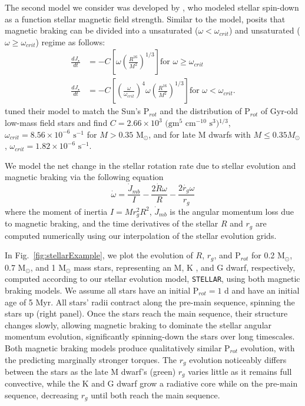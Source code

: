 \documentclass[twocolumn]{aastex61}
\newcommand{\stellar}[0]{\texttt{STELLAR}\xspace}
\begin{document}
The second model we consider was developed by \citet{Reiners2012}, who modeled stellar spin-down as a function stellar magnetic field strength.  Similar to the \citet{Matt2015} model, \citet{Reiners2012} posits that magnetic braking can be divided into a unsaturated ($\omega < \omega_{crit}$) and unsaturated ($\omega \geq \omega_{crit}$) regime as follows:
\begin{equation} \label{eqn:reiners}
\begin{split}
\frac{dJ_{\star}}{dt} & = -C \left[ \omega \left(\frac{R^{16}}{M^2} \right)^{1/3} \right] \text{for $\omega \geq \omega_{crit}$} \\
\frac{dJ_{\star}}{dt} & = -C \left[ \left( \frac{\omega}{\omega_{crit}} \right)^4 \omega \left(\frac{R^{16}}{M^2} \right)^{1/3} \right] \text{for $\omega < \omega_{crit}$}.
\end{split}
\end{equation}
\citet{Reiners2012} tuned their model to match the Sun's P$_{rot}$ and the distribution of P$_{rot}$ of Gyr-old low-mass field stars and find $C = 2.66 \times 10^3 \text{ (gm$^5$ cm$^{-10}$ s$^3$)$^{1/3}$}$, $\omega_{crit} = 8.56 \times 10^{-6}\text{ s$^{-1}$}$ for $M > 0.35$ M$_{\odot}$, and for late M dwarfs with $M \leq 0.35 M_{\odot}$, $\omega_{crit} = 1.82 \times 10^{-6} \text{ s$^{-1}$}$.

We model the net change in the stellar rotation rate due to stellar evolution and magnetic braking via the following equation 
\begin{equation} \label{eqn:stellar_rot_rate_dt}
\dot{\omega} = \frac{\dot{J}_{mb}}{I} - \frac{2 \dot{R} \omega}{R} - \frac{2 \dot{r_g} \omega}{r_g}
\end{equation}
where the moment of inertia $I = M r_g^2 R^2$, $\dot{J}_{mb}$ is the angular momentum loss due to magnetic braking, and the time derivatives of the stellar $R$ and $r_g$ are computed numerically using our interpolation of the \citet{Baraffe2015} stellar evolution grids.  

In Fig.~\ref{fig:stellarExample}, we plot the evolution of $R$, $r_g$, and P$_{rot}$ for 0.2 M$_{\odot}$, 0.7 M$_{\odot}$, and 1 M$_{\odot}$ mass stars, representing an M, K , and G dwarf, respectively, computed according to our stellar evolution model, \stellar, using both magnetic braking models. We assume all stars have an initial P$_{rot} = 1$ d and have an initial age of 5 Myr. All stars' radii contract along the pre-main sequence, spinning the stars up (right panel). Once the stars reach the main sequence, their structure changes slowly, allowing magnetic braking to dominate the stellar angular momentum evolution, significantly spinning-down the stars over long timescales. Both magnetic braking models produce qualitatively similar P$_{rot}$ evolution, with the \citet{Reiners2012} predicting marginally stronger torques. The $r_g$ evolution noticeably differs between the stars as the late M dwarf's (green) $r_g$ varies little as it remains full convective, while the K and G dwarf grow a radiative core while on the pre-main sequence, decreasing $r_g$ until both reach the main sequence.
\end{document}
